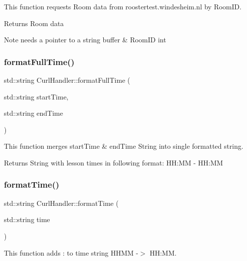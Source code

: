 This function requests Room data from roostertest.\+windesheim.\+nl by Room\+ID. 

\begin{DoxyReturn}{Returns}
Room data 
\end{DoxyReturn}
\begin{DoxyNote}{Note}
needs a pointer to a string buffer \& Room\+ID int 
\end{DoxyNote}
\mbox{\label{classCurlHandler_ae208efd8422979786ee921c5148b17c7}} 
\subsubsection{\texorpdfstring{format\+Full\+Time()}{formatFullTime()}}
{\footnotesize\ttfamily std\+::string Curl\+Handler\+::format\+Full\+Time (\begin{DoxyParamCaption}\item[{std\+::string}]{start\+Time,  }\item[{std\+::string}]{end\+Time }\end{DoxyParamCaption})}



This function merges start\+Time \& end\+Time String into single formatted string. 

\begin{DoxyReturn}{Returns}
String with lesson times in following format\+: HH\+:MM -\/ HH\+:MM 
\end{DoxyReturn}
\mbox{\label{classCurlHandler_a8552fd1c4558661d3699e4cbd8897acc}} 
\subsubsection{\texorpdfstring{format\+Time()}{formatTime()}}
{\footnotesize\ttfamily std\+::string Curl\+Handler\+::format\+Time (\begin{DoxyParamCaption}\item[{std\+::string}]{time }\end{DoxyParamCaption})}



This function adds \+: to time string H\+H\+MM -\/$>$ HH\+:MM. 

